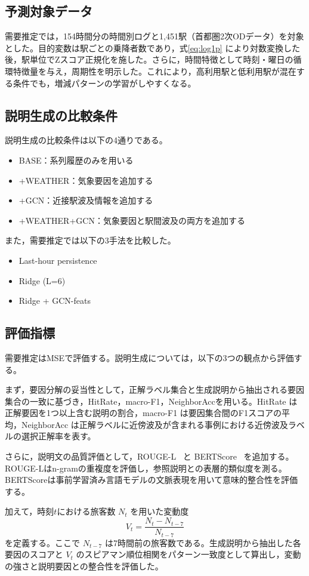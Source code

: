 \documentclass[technicalreport]{ieicej}
\begin{document}
\subsection{予測対象データ}
需要推定では，154時間分の時間別ログと1,451駅（首都圏2次ODデータ）を対象とした。目的変数は駅ごとの乗降者数であり，式\eqref{eq:log1p} により対数変換した後，駅単位でZスコア正規化を施した。さらに，時間特徴として時刻・曜日の循環特徴量を与え，周期性を明示した。これにより，高利用駅と低利用駅が混在する条件でも，増減パターンの学習がしやすくなる。

\subsection{説明生成の比較条件}
説明生成の比較条件は以下の4通りである。
\begin{itemize}
\item BASE：系列履歴のみを用いる
\item +WEATHER：気象要因を追加する
\item +GCN：近接駅波及情報を追加する
\item +WEATHER+GCN：気象要因と駅間波及の両方を追加する
\end{itemize}

また，需要推定では以下の3手法を比較した。
\begin{itemize}
\item Last-hour persistence
\item Ridge (L=6)
\item Ridge + GCN-feats
\end{itemize}

\subsection{評価指標}
需要推定はMSEで評価する。説明生成については，以下の3つの観点から評価する。

まず，要因分解の妥当性として，正解ラベル集合と生成説明から抽出される要因集合の一致に基づき，HitRate，macro-F1，NeighborAccを用いる。HitRate は正解要因を1つ以上含む説明の割合，macro-F1 は要因集合間のF1スコアの平均，NeighborAcc は正解ラベルに近傍波及が含まれる事例における近傍波及ラベルの選択正解率を表す。

さらに，説明文の品質評価として，ROUGE-L~\cite{lin2004rouge} と BERTScore~\cite{scorato2023bertscore} を追加する。ROUGE-Lはn-gramの重複度を評価し，参照説明との表層的類似度を測る。BERTScoreは事前学習済み言語モデルの文脈表現を用いて意味的整合性を評価する。

加えて，時刻$t$における旅客数 $N_t$ を用いた変動度
\begin{equation}
V_t=\frac{N_t-N_{t-7}}{N_{t-7}}
\label{eq:vt}
\end{equation}
を定義する。ここで $N_{t-7}$ は7時間前の旅客数である。生成説明から抽出した各要因のスコアと $V_t$ のスピアマン順位相関をパターン一致度として算出し，変動の強さと説明要因との整合性を評価した。
\end{document}
